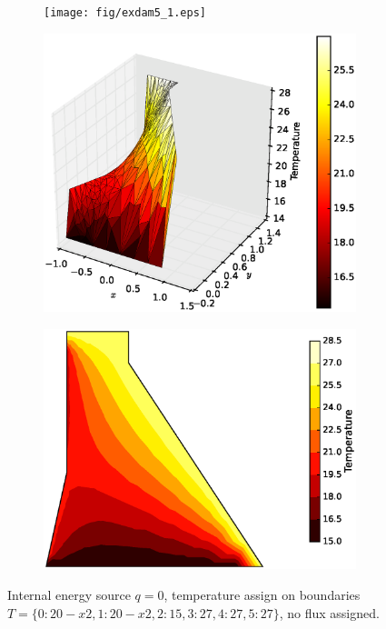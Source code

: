 \documentclass[10pt, a4paper]{article}
\begin{document}
\begin{figure}[H]
\centering
	\begin{subfigure}[H]{0.3\textwidth}
		\texttt{[image: fig/exdam5\_1.eps]}
		\caption{}
		\label{fig:1}
	\end{subfigure}
	\begin{subfigure}[H]{0.33\textwidth}
		\includegraphics[width=\textwidth]{fig/exdam5_2.eps}
		\caption{}
		\label{fig:2}
	\end{subfigure}
	\begin{subfigure}[H]{0.33\textwidth}
		\includegraphics[width=\textwidth]{fig/exdam5_3.eps}
		\caption{}
		\label{fig:3}
	\end{subfigure}
	\caption{Internal energy source $q=0$, temperature assign on boundaries $T=\{0:20-x2, 1:20-x2, 2:15, 3:27, 4:27, 5:27\}$, no flux assigned.}
	\label{fig:3_1}
\end{figure}
\end{document}
